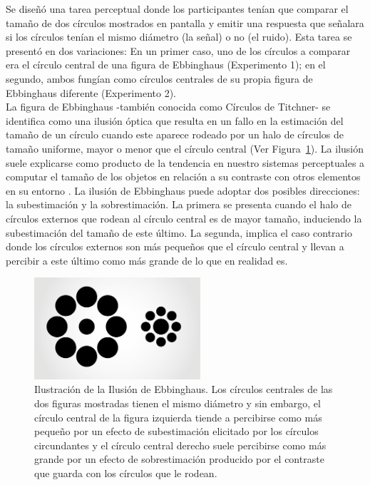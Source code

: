 Se diseñó una tarea perceptual donde los participantes tenían que comparar el tamaño de dos círculos mostrados en pantalla y emitir una respuesta que señalara si los círculos tenían el mismo diámetro (la señal) o no (el ruido). Esta tarea se presentó en dos variaciones: En un primer caso, uno de los círculos a comparar era el círculo central de una figura de Ebbinghaus (Experimento 1); en el segundo, ambos fungían como círculos centrales de su propia figura de Ebbinghaus diferente (Experimento 2).\\ 

La figura de Ebbinghaus -también conocida como Círculos de Titchner- se identifica como una ilusión óptica que resulta en un fallo en la estimación del tamaño de un círculo cuando este aparece rodeado por un halo de círculos de tamaño uniforme, mayor o menor que el círculo central (Ver Figura~\ref{fig:Ebbinghaus}). La ilusión suele explicarse como producto de la tendencia en nuestro sistemas perceptuales a computar el tamaño de los objetos en relación a su contraste con otros elementos en su entorno \parencite{Coren1971, Coren1974, Fockert2007}. La ilusión de Ebbinghaus puede adoptar dos posibles direcciones: la subestimación y la sobrestimación. La primera se presenta cuando el halo de círculos externos que rodean al círculo central es de mayor tamaño, induciendo la subestimación del tamaño de este último. La segunda, implica el caso contrario donde los círculos externos son más pequeños que el círculo central y llevan a percibir a este último como más grande de lo que en realidad es.\\

\begin{figure}[th]
\centering
\includegraphics[width=0.55\textwidth]{Figures/Ebbinghaus} 
\decoRule
\caption[Ilusión de Ebbinghaus: Ejemplos]{Ilustración de la Ilusión de Ebbinghaus. Los círculos centrales de las dos figuras mostradas tienen el mismo diámetro y sin embargo, el círculo central de la figura izquierda tiende a percibirse como más pequeño por un efecto de subestimación elicitado por los círculos circundantes y el círculo central derecho suele percibirse como más grande por un efecto de sobrestimación producido por el contraste que guarda con los círculos que le rodean.}
\label{fig:Ebbinghaus}
\end{figure}

